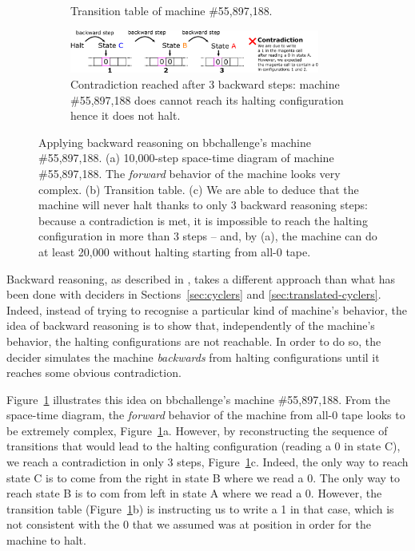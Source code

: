 \begin{figure}
\begin{subfigure}[m]{0.45\textwidth}
    \caption{Transition table of machine \#55,897,188.}

  \end{subfigure}

  \begin{subfigure}[m]{1\textwidth}
    \vspace{5ex}
    \centering
    \includegraphics[width=0.9\textwidth]{figures/backward-reasoning/backward-reasoning.pdf}

    \caption{Contradiction reached after 3 backward steps: machine \#55,897,188 does cannot reach its halting configuration hence it does not halt.}

  \end{subfigure}

  \caption{Applying backward reasoning on bbchallenge's machine \#55,897,188. (a) 10,000-step space-time diagram of machine \#55,897,188. The \textit{forward} behavior of the machine looks very complex. (b) Transition table. (c) We are able to deduce that the machine will never halt thanks to only 3 backward reasoning steps: because a contradiction is met, it is impossible to reach the halting configuration in more than 3 steps -- and, by (a), the machine can do at least 20,000 without halting starting from all-0 tape.}
  \label{fig:backward-reasoning}
\end{figure}


Backward reasoning, as described in \cite{Marxen_1998}, takes a different approach than what has been done with deciders in Sections~\ref{sec:cyclers} and \ref{sec:translated-cyclers}. Indeed, instead of trying to recognise a particular kind of machine's behavior, the idea of backward reasoning is to show that, independently of the machine's behavior, the halting configurations are not reachable. In order to do so, the decider simulates the machine \textit{backwards} from halting configurations until it reaches some obvious contradiction.

Figure~\ref{fig:backward-reasoning} illustrates this idea on bbchallenge's machine \#55,897,188. From the space-time diagram, the \textit{forward} behavior of the machine from all-0 tape looks to be extremely complex, Figure~\ref{fig:backward-reasoning}a. However, by reconstructing the sequence of transitions that would lead to the halting configuration (reading a 0 in state \textcolor{colorC}{C}), we reach a contradiction in only 3 steps, Figure~\ref{fig:backward-reasoning}c. Indeed, the only way to reach state  \textcolor{colorC}{C} is to come from the right in state \textcolor{colorB}{B} where we read a 0. The only way to reach state \textcolor{colorB}{B} is to com from left in state  \textcolor{colorA}{A} where we read a 0. However, the transition table (Figure~\ref{fig:backward-reasoning}b) is instructing us to write a 1 in that case, which is not consistent with the 0 that we assumed was at position in order for the machine to halt.

